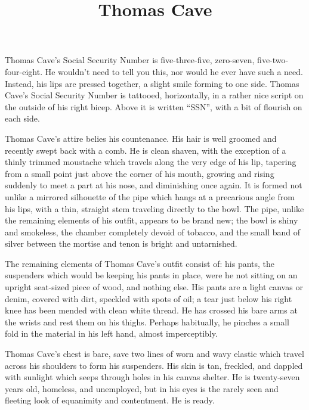 \documentclass[letterpaper]{article}
\title{Thomas Cave}
\date{}
\begin{document}
	\maketitle
	\thispagestyle{empty}
	\onehalfspacing
   Thomas Cave's Social Security Number is five-three-five, zero-seven, five-two-four-eight. He wouldn't need to tell you this, nor would he ever have such a need. Instead, his lips are pressed together, a slight smile forming to one side. Thomas Cave's Social Security Number is tattooed, horizontally, in a rather nice script on the outside of his right bicep. Above it is written ``SSN'', with a bit of flourish on each side.

   Thomas Cave's attire belies his countenance. His hair is well groomed and recently swept back with a comb. He is clean shaven, with the exception of a thinly trimmed moustache which travels along the very edge of his lip, tapering from a small point just above the corner of his mouth, growing and rising suddenly to meet a part at his nose, and diminishing once again. It is formed not unlike a mirrored silhouette of the pipe which hangs at a precarious angle from his lips, with a thin, straight stem traveling directly to the bowl. The pipe, unlike the remaining elements of his outfit, appears to be brand new; the bowl is shiny and smokeless, the chamber completely devoid of tobacco, and the small band of silver between the mortise and tenon is bright and untarnished.

   The remaining elements of Thomas Cave's outfit consist of: his pants, the suspenders which would be keeping his pants in place, were he not sitting on an upright seat-sized piece of wood, and nothing else. His pants are a light canvas or denim, covered with dirt, speckled with spots of oil; a tear just below his right knee has been mended with clean white thread. He has crossed his bare arms at the wrists and rest them on his thighs. Perhaps habitually, he pinches a small fold in the material in his left hand, almost imperceptibly.

   Thomas Cave's chest is bare, save two lines of worn and wavy elastic which travel across his shoulders to form his suspenders. His skin is tan, freckled, and dappled with sunlight which seeps through holes in his canvas shelter. He is twenty-seven years old, homeless, and unemployed, but in his eyes is the rarely seen and fleeting look of equanimity and contentment. He is ready.
\end{document}
